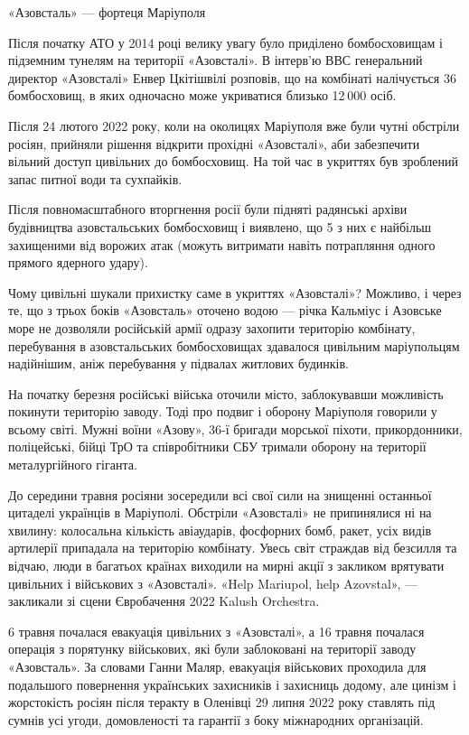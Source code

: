 «Азовсталь» — фортеця Маріуполя

Після початку АТО у 2014 році велику увагу було приділено бомбосховищам і
підземним тунелям на території «Азовсталі». В інтерв'ю ВВС генеральний директор
«Азовсталі» Енвер Цкітішвілі розповів, що на комбінаті налічується 36
бомбосховищ, в яких одночасно може укриватися близько 12 000 осіб.

Після 24 лютого 2022 року, коли на околицях Маріуполя вже були чутні обстріли
росіян, прийняли рішення відкрити прохідні «Азовсталі», аби забезпечити вільний
доступ цивільних до бомбосховищ. На той час в укриттях був зроблений запас
питної води та сухпайків.

Після повномасштабного вторгнення росії були підняті радянські архіви
будівництва азовстальських бомбосховищ і виявлено, що 5 з них є найбільш
захищеними від ворожих атак (можуть витримати навіть потрапляння одного прямого
ядерного удару).

Чому цивільні шукали прихистку саме в укриттях «Азовсталі»? Можливо, і через
те, що з трьох боків «Азовсталь» оточено водою — річка Кальміус і Азовське море
не дозволяли російській армії одразу захопити територію комбінату, перебування
в азовстальських бомбосховищах здавалося цивільним маріупольцям надійнішим,
аніж перебування у підвалах житлових будинків.

На початку березня російські війська оточили місто, заблокувавши можливість
покинути територію заводу. Тоді про подвиг і оборону Маріуполя говорили у
всьому світі. Мужні воїни «Азову», 36-ї бригади морської піхоти, прикордонники,
поліцейські, бійці ТрО та співробітники СБУ тримали оборону на території
металургійного гіганта. 

До середини травня росіяни зосередили всі свої сили на знищенні останньої
цитаделі українців в Маріуполі. Обстріли «Азовсталі» не припинялися ні на
хвилину: колосальна кількість авіаударів, фосфорних бомб, ракет, усіх видів
артилерії припадала на територію комбінату. Увесь світ страждав від безсилля та
відчаю, люди в багатьох країнах виходили на мирні акції з закликом врятувати
цивільних і військових з «Азовсталі». «Help Mariupol, help Azovstal», —
закликали зі сцени Євробачення 2022 Kalush Orchestra.

6 травня почалася евакуація цивільних з «Азовсталі», а 16 травня почалася
операція з порятунку військових, які були заблоковані на території заводу
«Азовсталь». За словами Ганни Маляр, евакуація військових проходила для
подальшого повернення українських захисників і захисниць додому, але цинізм і
жорстокість росіян після теракту в Оленівці 29 липня 2022 року ставлять під
сумнів усі угоди, домовленості та гарантії з боку міжнародних організацій.

